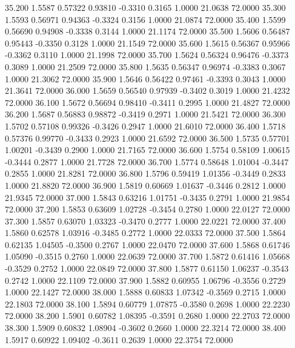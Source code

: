   35.200   1.5587   0.57322   0.93810  -0.3310   0.3165   1.0000  21.0638  72.0000
  35.300   1.5593   0.56971   0.94363  -0.3324   0.3156   1.0000  21.0874  72.0000
  35.400   1.5599   0.56690   0.94908  -0.3338   0.3144   1.0000  21.1174  72.0000
  35.500   1.5606   0.56487   0.95443  -0.3350   0.3128   1.0000  21.1549  72.0000
  35.600   1.5615   0.56367   0.95966  -0.3362   0.3110   1.0000  21.1998  72.0000
  35.700   1.5624   0.56324   0.96476  -0.3373   0.3089   1.0000  21.2509  72.0000
  35.800   1.5635   0.56347   0.96974  -0.3383   0.3067   1.0000  21.3062  72.0000
  35.900   1.5646   0.56422   0.97461  -0.3393   0.3043   1.0000  21.3641  72.0000
  36.000   1.5659   0.56540   0.97939  -0.3402   0.3019   1.0000  21.4232  72.0000
  36.100   1.5672   0.56694   0.98410  -0.3411   0.2995   1.0000  21.4827  72.0000
  36.200   1.5687   0.56883   0.98872  -0.3419   0.2971   1.0000  21.5421  72.0000
  36.300   1.5702   0.57108   0.99326  -0.3426   0.2947   1.0000  21.6010  72.0000
  36.400   1.5718   0.57376   0.99770  -0.3433   0.2923   1.0000  21.6592  72.0000
  36.500   1.5735   0.57701   1.00201  -0.3439   0.2900   1.0000  21.7165  72.0000
  36.600   1.5754   0.58109   1.00615  -0.3444   0.2877   1.0000  21.7728  72.0000
  36.700   1.5774   0.58648   1.01004  -0.3447   0.2855   1.0000  21.8281  72.0000
  36.800   1.5796   0.59419   1.01356  -0.3449   0.2833   1.0000  21.8820  72.0000
  36.900   1.5819   0.60669   1.01637  -0.3446   0.2812   1.0000  21.9345  72.0000
  37.000   1.5843   0.63216   1.01751  -0.3435   0.2791   1.0000  21.9854  72.0000
  37.200   1.5853   0.63609   1.02728  -0.3454   0.2780   1.0000  22.0127  72.0000
  37.300   1.5857   0.63070   1.03323  -0.3470   0.2777   1.0000  22.0221  72.0000
  37.400   1.5860   0.62578   1.03916  -0.3485   0.2772   1.0000  22.0333  72.0000
  37.500   1.5864   0.62135   1.04505  -0.3500   0.2767   1.0000  22.0470  72.0000
  37.600   1.5868   0.61746   1.05090  -0.3515   0.2760   1.0000  22.0639  72.0000
  37.700   1.5872   0.61416   1.05668  -0.3529   0.2752   1.0000  22.0849  72.0000
  37.800   1.5877   0.61150   1.06237  -0.3543   0.2742   1.0000  22.1109  72.0000
  37.900   1.5882   0.60955   1.06796  -0.3556   0.2729   1.0000  22.1427  72.0000
  38.000   1.5888   0.60833   1.07342  -0.3569   0.2715   1.0000  22.1803  72.0000
  38.100   1.5894   0.60779   1.07875  -0.3580   0.2698   1.0000  22.2230  72.0000
  38.200   1.5901   0.60782   1.08395  -0.3591   0.2680   1.0000  22.2703  72.0000
  38.300   1.5909   0.60832   1.08904  -0.3602   0.2660   1.0000  22.3214  72.0000
  38.400   1.5917   0.60922   1.09402  -0.3611   0.2639   1.0000  22.3754  72.0000
